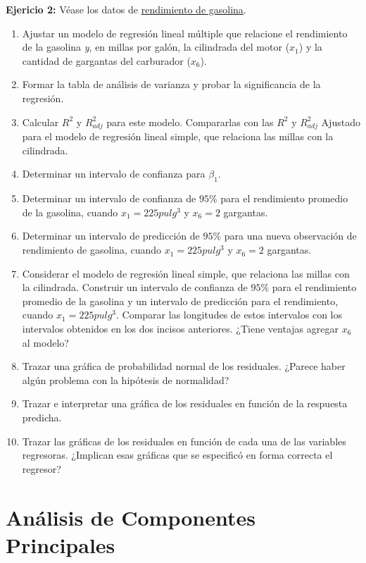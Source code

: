 \documentclass[
]{book}
\begin{document}
\textbf{Ejericio 2:} Véase los datos de \href{https://github.com/HaydeePeruyero/MultivariateStatisticalAnalysis/tree/main/data/Rendimiento_de_gasolina.csv}{rendimiento de gasolina}.

\begin{enumerate}
\def\labelenumi{\alph{enumi})}
\item
  Ajustar un modelo de regresión lineal múltiple que relacione el rendimiento de la gasolina \emph{y}, en millas por galón, la cilindrada del motor (\(x_1\)) y la cantidad de gargantas del carburador (\(x_6\)).
\item
  Formar la tabla de análisis de varianza y probar la significancia de la regresión.
\item
  Calcular \(R^2\) y \(R^2_{adj}\) para este modelo. Compararlas con las \(R^2\) y \(R^2_{adj}\) Ajustado para el modelo de regresión lineal simple, que relaciona las millas con la cilindrada.
\item
  Determinar un intervalo de confianza para \(\beta_1\).
\item
  Determinar un intervalo de confianza de \(95\%\) para el rendimiento promedio de la gasolina, cuando \(x_1 = 225 pulg^3\) y \(x_6 = 2\) gargantas.
\item
  Determinar un intervalo de predicción de \(95\%\) para una nueva observación de rendimiento de gasolina, cuando \(x_1 = 225 pulg^3\) y \(x_6 = 2\) gargantas.
\item
  Considerar el modelo de regresión lineal simple, que relaciona las millas con la cilindrada. Construir un intervalo de confianza de \(95\%\) para el rendimiento promedio de la gasolina y un intervalo de predicción para el rendimiento, cuando \(x_1 = 225 pulg^3\). Comparar las longitudes de estos intervalos con los intervalos obtenidos en los dos incisos anteriores. ¿Tiene ventajas agregar \(x_6\) al modelo?
\item
  Trazar una gráfica de probabilidad normal de los residuales. ¿Parece haber algún problema con la hipótesis de normalidad?
\item
  Trazar e interpretar una gráfica de los residuales en función de la respuesta predicha.
\item
  Trazar las gráficas de los residuales en función de cada una de las variables regresoras. ¿Implican esas gráficas que se especificó en forma correcta el regresor?
\end{enumerate}

\chapter{Análisis de Componentes Principales}\label{anuxe1lisis-de-componentes-principales}
\end{document}
